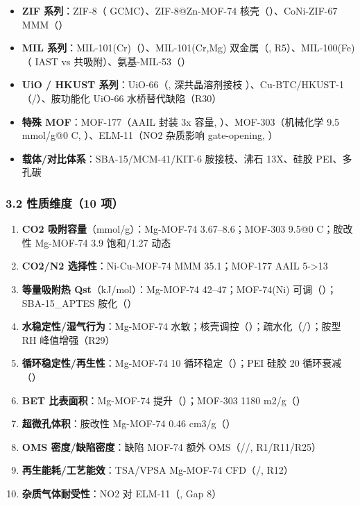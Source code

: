 \documentclass[12pt,a4paper]{ctexart}
\providecommand{\tightlist}{%
  \setlength{\itemsep}{0pt}\setlength{\parskip}{0pt}}
\begin{document}
\begin{itemize}
\tightlist
\item
  \textbf{ZIF 系列}：ZIF-8（\cite{p30} GCMC）、ZIF-8@Zn-MOF-74 核壳（\cite{p2}）、CoNi-ZIF-67 MMM（\cite{p75}）
\item
  \textbf{MIL 系列}：MIL-101(Cr)（\cite{p28}）、MIL-101(Cr,Mg) 双金属（\cite{p147}, R5）、MIL-100(Fe)（\cite{p166} IAST vs 共吸附）、氨基-MIL-53（\cite{p156}）
\item
  \textbf{UiO / HKUST 系列}：UiO-66（\cite{p30}, 深共晶溶剂接枝 \cite{p25}）、Cu-BTC/HKUST-1（\cite{p28}/\cite{p173}）、胺功能化 UiO-66 水桥替代缺陷（R30）
\item
  \textbf{特殊 MOF}：MOF-177（AAIL 封装 3x 容量, \cite{p104}）、MOF-303（机械化学 9.5 mmol/g@0 C, \cite{p76}）、ELM-11（NO2 杂质影响 gate-opening, \cite{p216}）
\item
  \textbf{载体/对比体系}：SBA-15/MCM-41/KIT-6 胺接枝、沸石 13X、硅胶 PEI、多孔碳
\end{itemize}

\subsubsection{3.2 性质维度（10 项）}\label{ux6027ux8d28ux7ef4ux5ea610-ux9879}

\begin{enumerate}
\def\labelenumi{\arabic{enumi}.}
\tightlist
\item
  \textbf{CO2 吸附容量}（mmol/g）：Mg-MOF-74 3.67--8.6；MOF-303 9.5@0 C；胺改性 Mg-MOF-74 3.9 饱和/1.27 动态
\item
  \textbf{CO2/N2 选择性}：Ni-Cu-MOF-74 MMM 35.1；MOF-177 AAIL 5-\textgreater13
\item
  \textbf{等量吸附热 Qst}（kJ/mol）：Mg-MOF-74 42--47；MOF-74(Ni) 可调（\cite{p27}）；SBA-15\_APTES 胺化（\cite{p129}）
\item
  \textbf{水稳定性/湿气行为}：Mg-MOF-74 水敏；核壳调控（\cite{p116}）；疏水化（\cite{p201}/\cite{p224}）；胺型 RH 峰值增强（R29）
\item
  \textbf{循环稳定性/再生性}：Mg-MOF-74 10 循环稳定（\cite{p197}）；PEI 硅胶 20 循环衰减（\cite{p206}）
\item
  \textbf{BET 比表面积}：Mg-MOF-74 提升（\cite{p197}）；MOF-303 1180 m2/g（\cite{p76}）
\item
  \textbf{超微孔体积}：胺改性 Mg-MOF-74 0.46 cm3/g（\cite{p193}）
\item
  \textbf{OMS 密度/缺陷密度}：缺陷 MOF-74 额外 OMS（\cite{p7}/\cite{p13}/\cite{p192}, R1/R11/R25）
\item
  \textbf{再生能耗/工艺能效}：TSA/VPSA Mg-MOF-74 CFD（\cite{p176}/\cite{p178}, R12）
\item
  \textbf{杂质气体耐受性}：NO2 对 ELM-11（\cite{p216}, Gap 8）
\end{enumerate}
\end{document}
